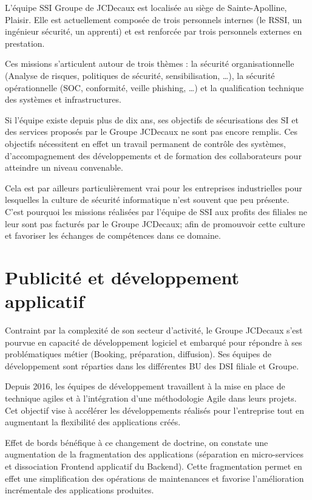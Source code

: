 L'équipe \ac{SSI} Groupe de JCDecaux est localisée au siège de Sainte-Apolline, Plaisir.
Elle est actuellement composée de trois personnels internes (le \ac{RSSI}, un ingénieur sécurité, un apprenti) et est 
renforcée par trois personnels externes en prestation.

Ces missions s'articulent autour de trois thèmes : la sécurité organisationnelle (Analyse de risques, 
politiques de sécurité, sensibilisation, \dots), la sécurité opérationnelle (\ac{SOC}, conformité, veille phishing, \dots) et 
la qualification technique des systèmes et infrastructures.

Si l'équipe existe depuis plus de dix ans, ses objectifs de sécurisations des \ac{SI} et des services proposés par le 
Groupe JCDecaux ne sont pas encore remplis. Ces objectifs nécessitent en effet un travail permanent de contrôle des 
systèmes, d'accompagnement des développements et de formation des collaborateurs pour atteindre un niveau convenable.

Cela est par ailleurs particulièrement vrai pour les entreprises industrielles pour lesquelles la culture de 
sécurité informatique n'est souvent que peu présente. 
\newline C'est pourquoi les missions réalisées par l'équipe de \ac{SSI} aux profits des filiales ne leur sont pas 
facturés par le Groupe JCDecaux; afin de promouvoir cette culture et favoriser les échanges de compétences dans ce domaine.  



\section{Publicité et développement applicatif}
Contraint par la complexité de son secteur d'activité, le Groupe JCDecaux s'est pourvue en capacité de développement
logiciel et embarqué pour répondre à ses problématiques métier (\eg Booking, préparation, diffusion).
Ses équipes de développement sont réparties dans les différentes \ac{BU} des \ac{DSI} filiale et Groupe.

Depuis 2016, les équipes de développement travaillent à la mise en place de technique agiles et à l'intégration d'une 
méthodologie Agile dans leurs projets. Cet objectif vise à accélérer les développements réalisés 
pour l'entreprise tout en augmentant la flexibilité des applications créés. 

Effet de bords bénéfique à ce changement de doctrine, on constate une augmentation de la fragmentation des applications
(séparation en micro-services et dissociation Frontend applicatif du Backend). Cette fragmentation permet en effet une
simplification des opérations de maintenances et favorise l'amélioration incrémentale des applications produites.

